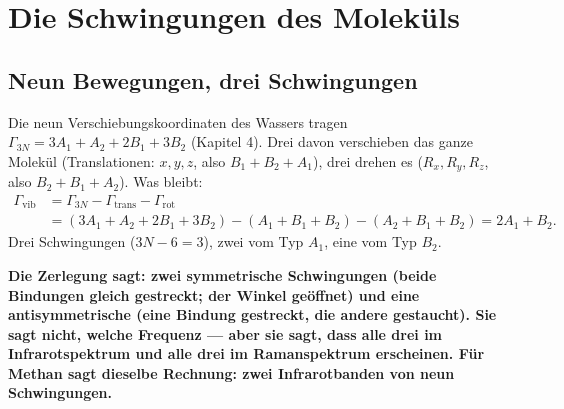 \chapter{Die Schwingungen des Moleküls}

\section{Neun Bewegungen, drei Schwingungen}

\begin{merksatz}
Die neun Verschiebungskoordinaten des Wassers tragen $\Gamma_{3N} = 3A_1 + A_2 + 2B_1 + 3B_2$ (Kapitel 4). Drei davon verschieben das ganze Molekül (Translationen: $x, y, z$, also $B_1 + B_2 + A_1$), drei drehen es ($R_x, R_y, R_z$, also $B_2 + B_1 + A_2$). Was bleibt:
\begin{align*} \Gamma_{\mathrm{vib}} &= \Gamma_{3N} - \Gamma_{\mathrm{trans}} - \Gamma_{\mathrm{rot}}\\ &= (3A_1 + A_2 + 2B_1 + 3B_2) - (A_1 + B_1 + B_2) - (A_2 + B_1 + B_2) = 2A_1 + B_2 . \end{align*}
Drei Schwingungen ($3N - 6 = 3$), zwei vom Typ $A_1$, eine vom Typ $B_2$.

\begin{center}
\end{center}

\begin{center}
\begin{minipage}{0.9\textwidth}
\textbf{Die Zerlegung sagt: zwei symmetrische Schwingungen (beide Bindungen gleich gestreckt; der Winkel geöffnet) und eine antisymmetrische (eine Bindung gestreckt, die andere gestaucht). Sie sagt nicht, welche Frequenz --- aber sie sagt, dass alle drei im Infrarotspektrum und alle drei im Ramanspektrum erscheinen. Für Methan sagt dieselbe Rechnung: zwei Infrarotbanden von neun Schwingungen.}
\end{minipage}
\end{center}


\end{merksatz}
